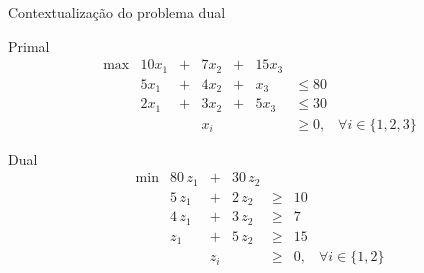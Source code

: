 \documentclass[compress,mathserif]{beamer}
\begin{document}
\begin{frame}{Contextualização do problema dual}

\centering Primal
        $$\begin{matrix}
        \max & 10x_1 & + & 7x_2 & + & 15x_3 \\ 
             & 5x_1 & + & 4x_2 & + & x_3 & \leq 80 \\
             & 2x_1 & + & 3x_2 & + & 5x_3& \leq 30 \\
             & & & x_i & & & \geq 0, & \forall i \in \{1, 2, 3\}
        \end{matrix}    
$$

\vspace{0.7cm}

        \centering Dual
        $$\begin{matrix}
        \min & 80\,z_1 & + & 30\,z_2 \\
         & 5\,z_1 & + & 2\,z_2 & \geq & 10 \\
         & 4\,z_1 & + & 3\,z_2 & \geq & 7 \\
         & z_1 & + & 5\,z_2 & \geq & 15 \\
         & & z_i & & \geq & 0, & \forall i \in \{1, 2\}
        \end{matrix}
$$
\end{frame}

\end{document}
